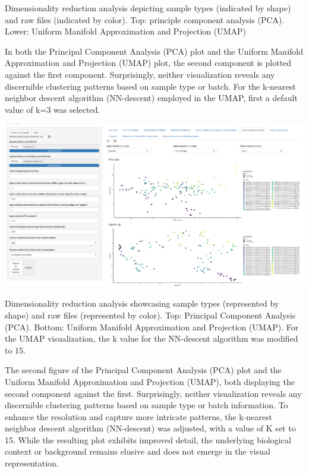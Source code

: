 \documentclass[
  11pt,
]{article}
\let\origfigure\figure
\begin{document}
\caption{Dimensionality reduction analysis depicting sample types (indicated by shape) and raw files (indicated by color). Top: principle component analysis (PCA). Lower: Uniform Manifold Approximation and Projection (UMAP)}\label{fig:ui_dim_red_default}
 \endfigure\egroup

In both the Principal Component Analysis (PCA) plot and the Uniform
Manifold Approximation and Projection (UMAP) plot, the second component
is plotted against the first component. Surprisingly, neither
visualization reveals any discernible clustering patterns based on
sample type or batch. For the k-nearest neighbor descent algorithm
(NN-descent) employed in the UMAP, first a default value of k=3 was
selected.

\newpage
\bgroup  \origfigure[H] 

{\centering \includegraphics[width=1\linewidth]{screenshots/dim_red_changed_k} 

}

\caption{Dimensionality reduction analysis showcasing sample types (represented by shape) and raw files (represented by color). Top: Principal Component Analysis (PCA). Bottom: Uniform Manifold Approximation and Projection (UMAP). For the UMAP visualization, the k value for the NN-descent algorithm was modified to 15.}\label{fig:ui_dim_red_changed_k}
 \endfigure\egroup

The second figure of the Principal Component Analysis (PCA) plot and the
Uniform Manifold Approximation and Projection (UMAP), both displaying
the second component against the first. Surprisingly, neither
visualization reveals any discernible clustering patterns based on
sample type or batch information. To enhance the resolution and capture
more intricate patterns, the k-nearest neighbor descent algorithm
(NN-descent) was adjusted, with a value of K set to 15. While the
resulting plot exhibits improved detail, the underlying biological
context or background remains elusive and does not emerge in the visual
representation.
\end{document}
